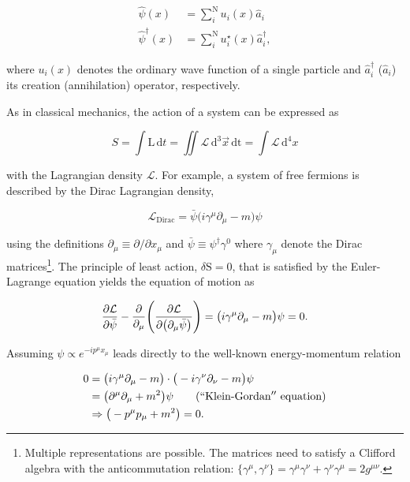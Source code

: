 \begin{align}
    \hat{\psi}(x)&=\sum_{i}^{\mathrm{N}}u_{i}(x)\hat{a}_{i} \\
    \hat{\psi}^{\dagger}(x)&=\sum_{i}^{\mathrm{N}}u^{\star}_{i}(x)\hat{a}^{\dagger}_{i},
\end{align}

where $u_{i}(x)$ denotes the ordinary wave function of a single particle and $\hat{a}^{\dagger}_{i}$ ($\hat{a}_{i}$) its creation (annihilation) operator, respectively.

As in classical mechanics, the action of a system can be expressed as

\begin{equation}
S=\int\mathrm{L}\,\mathrm{d}t=\iint\mathcal{L}\,\mathrm{d}^{3}\vec{x}\,\mathrm{dt}=\int\mathcal{L}\,\mathrm{d}^{4}x
\end{equation}

with the Lagrangian density $\mathcal{L}$. For example, a system of free fermions is described by the Dirac Lagrangian density,

\begin{equation}
\label{eq:theory-diracL}
\mathcal{L}_\mathrm{Dirac}=\bar{\psi}\big(i\gamma^\mu\partial_\mu-m\big)\psi
\end{equation}

using the definitions $\partial_\mu\equiv\partial/\partial x_\mu$ and $\bar{\psi}\equiv\psi^\dagger\gamma^{0}$ where $\gamma_\mu$ denote the Dirac matrices\footnote{Multiple representations are possible. The matrices need to satisfy a Clifford algebra with the anticommutation relation: $\big\{\gamma^\mu,\gamma^\nu\big\}=\gamma^\mu\gamma^\nu+\gamma^\nu\gamma^\mu=2g^{\mu\nu}$.}. The principle of least action, $\delta \mathrm{S}=0$, that is satisfied by the Euler-Lagrange equation yields the equation of motion as

\begin{equation}
\frac{\partial\mathcal{L}}{\partial\bar{\psi}}-\frac{\partial}{\partial_\mu}\Bigg(\frac{\partial\mathcal{L}}{\partial\big(\partial_\mu\bar{\psi}\big)}\Bigg)=\big(i\gamma^\mu\partial_\mu-m\big)\psi=0. \\
\end{equation}

Assuming $\psi\propto e^{-ip^{\mu}x_{\mu}}$ leads directly to the well-known energy-momentum relation

\begin{align}
0&=\big(i\gamma^\mu\partial_\mu-m\big)\cdot \big(-i\gamma^\nu\partial_\nu-m\big)\psi\\
 &=\big(\partial^{\mu}\partial_{\mu}+m^{2}\big)\psi \qquad \mathrm{(``Klein\mbox{-}Gordan''~equation)}  \\
 &\Rightarrow \big(-p^{\mu}p_{\mu}+m^{2}\big) = 0.
\end{align}


